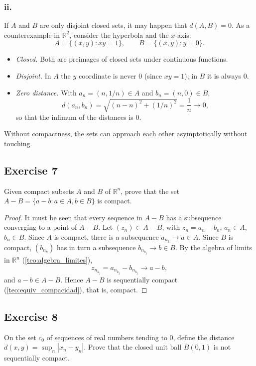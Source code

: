\documentclass[11pt, a4paper]{article}
\begin{document}
\subsubsection*{ii.}
If $A$ and $B$ are only disjoint closed sets, it may happen that $d(A, B) = 0$. As a counterexample in
$\mathbb{R}^2$, consider the hyperbola and the $x$-axis:
$$ A = \{ (x, y) : xy = 1 \}, \qquad B = \{ (x, y) : y = 0 \}. $$
\begin{itemize}
    \item \textit{Closed.} Both are preimages of closed sets under continuous functions.
    \item \textit{Disjoint.} In $A$ the $y$ coordinate is never $0$ (since $xy = 1$); in $B$ it is always
    $0$.
    \item \textit{Zero distance.} With $a_n = (n, 1/n) \in A$ and $b_n = (n, 0) \in B$,
    $$ d(a_n, b_n) = \sqrt{(n-n)^2 + (1/n)^2} = \frac{1}{n} \to 0, $$
    so that the infimum of the distances is $0$.
\end{itemize}
Without compactness, the sets can approach each other asymptotically without touching.

\subsection*{Exercise 7}

Given compact subsets $A$ and $B$ of $\mathbb{R}^n$, prove that the set
$A - B = \{a - b : a \in A, b \in B\}$ is compact.

\begin{proof}
It must be seen that every sequence in $A - B$ has a subsequence converging to a point of $A - B$.
Let $(z_n) \subset A - B$, with $z_n = a_n - b_n$, $a_n \in A$, $b_n \in B$. Since $A$ is compact, there is
a subsequence $a_{n_k} \to a \in A$. Since $B$ is compact, $(b_{n_k})$ has in turn a
subsequence $b_{n_{k_j}} \to b \in B$. By the algebra of limits in $\mathbb{R}^n$
(\ref{teo:algebra_limites}),
$$ z_{n_{k_j}} = a_{n_{k_j}} - b_{n_{k_j}} \to a - b, $$
and $a - b \in A - B$. Hence $A - B$ is sequentially compact (\ref{teo:equiv_compacidad}), that is, compact.
\end{proof}

\subsection*{Exercise 8}

On the set $c_0$ of sequences of real numbers tending to 0, define the distance
$d(x, y) = \sup_n |x_n - y_n|$.
Prove that the closed unit ball $\overline{B}(0, 1)$ is not sequentially compact.
\end{document}
